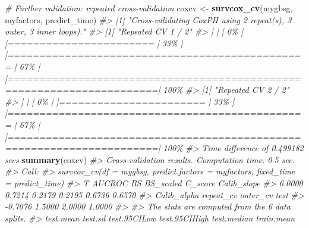 \documentclass[
]{article}
\newenvironment{Shaded}{\begin{snugshade}}{\end{snugshade}}
\newcommand{\CommentTok}[1]{\textcolor[rgb]{0.56,0.35,0.01}{\textit{#1}}}
\newcommand{\FunctionTok}[1]{\textcolor[rgb]{0.13,0.29,0.53}{\textbf{#1}}}
\newcommand{\NormalTok}[1]{#1}
\newcommand{\OtherTok}[1]{\textcolor[rgb]{0.56,0.35,0.01}{#1}}
\begin{document}
\begin{Shaded}
\begin{Highlighting}[]
\CommentTok{\# Further validation: repeated cross{-}validation }
\NormalTok{coxcv }\OtherTok{\textless{}{-}} \FunctionTok{survcox\_cv}\NormalTok{(mygbsg, myfactors, predict\_time)}
\CommentTok{\#\textgreater{} [1] "Cross{-}validating CoxPH using 2 repeat(s), 3 outer, 3 inner loops)."}
\CommentTok{\#\textgreater{} [1] "Repeated CV 1 / 2"}
\CommentTok{\#\textgreater{}   |                                                                              |                                                                      |   0\%  |                                                                              |=======================                                               |  33\%  |                                                                              |===============================================                       |  67\%  |                                                                              |======================================================================| 100\%}
\CommentTok{\#\textgreater{} [1] "Repeated CV 2 / 2"}
\CommentTok{\#\textgreater{}   |                                                                              |                                                                      |   0\%  |                                                                              |=======================                                               |  33\%  |                                                                              |===============================================                       |  67\%  |                                                                              |======================================================================| 100\%}
\CommentTok{\#\textgreater{} Time difference of 0.499182 secs}
\FunctionTok{summary}\NormalTok{(coxcv)}
\CommentTok{\#\textgreater{} Cross{-}validation results. Computation time: 0.5 sec. }
\CommentTok{\#\textgreater{} Call:}
\CommentTok{\#\textgreater{} survcox\_cv(df = mygbsg, predict.factors = myfactors, fixed\_time = predict\_time)}
\CommentTok{\#\textgreater{}           T      AUCROC          BS   BS\_scaled     C\_score Calib\_slope }
\CommentTok{\#\textgreater{}      6.0000      0.7214      0.2179      0.2195      0.6736      0.6570 }
\CommentTok{\#\textgreater{} Calib\_alpha   repeat\_cv    outer\_cv        test }
\CommentTok{\#\textgreater{}     {-}0.7076      1.5000      2.0000      1.0000 }
\CommentTok{\#\textgreater{} }
\CommentTok{\#\textgreater{} The stats are computed from the  6  data splits.}
\CommentTok{\#\textgreater{}             test.mean test.sd test.95CILow test.95CIHigh test.median train.mean}

\end{Highlighting}
\end{Shaded}
\end{document}
